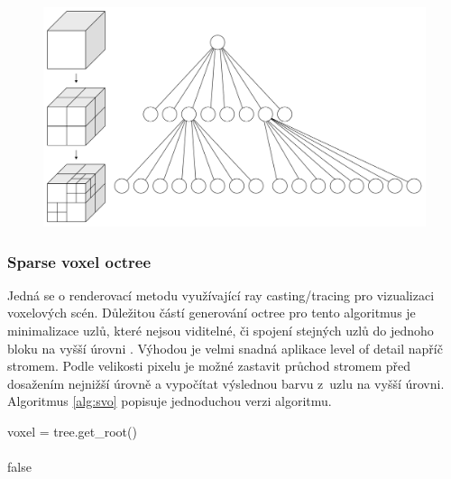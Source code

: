 \begin{figure}[H]
	\centering
	\includegraphics[scale=0.12]{obrazky-figures/Octree2.pdf}
	\captionsetup{justification=centering}
	\label{fig:slabs}
\end{figure}


\subsubsection{Sparse voxel octree}\label{svo_alg}
Jedná se o renderovací metodu využívající ray casting/tracing pro vizualizaci voxelových scén. Důležitou částí generování octree pro tento algoritmus je minimalizace uzlů, které nejsou viditelné, či spojení stejných uzlů do jednoho bloku na vyšší úrovni \cite{Laine2011EfficientSV}. Výhodou je velmi snadná aplikace level of detail napříč stromem. Podle velikosti pixelu je možné zastavit průchod stromem před dosažením nejnižší úrovně a vypočítat výslednou barvu z~uzlu na vyšší úrovni. Algoritmus \ref{alg:svo} popisuje jednoduchou verzi algoritmu.

\begin{center}
	\begin{czechalgorithm}[H] \label{alg:svo}
		voxel = tree.get\_root()\\
		\\
		\KwRet false
		\caption{Sparse voxel octree ray casting}
	\end{czechalgorithm}
\end{center}

